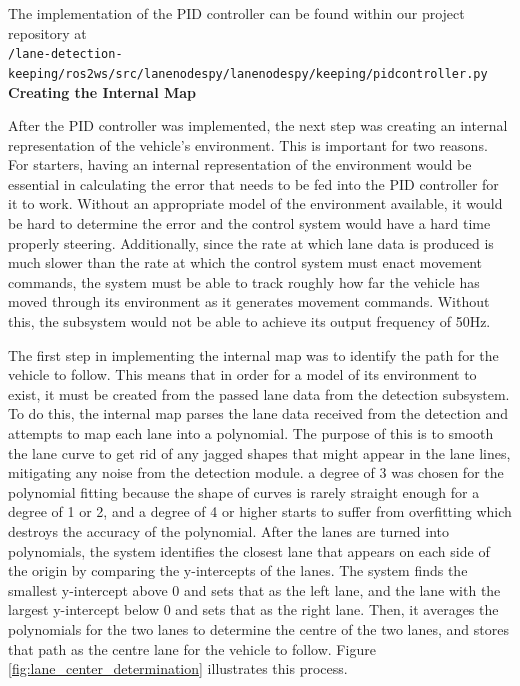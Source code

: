 \documentclass[titlepage, draft]{article}
\begin{document}
{The implementation of the PID controller can be found within our project
repository at \\\texttt{/lane-detection-keeping/ros2\textunderscore ws/src/lane\textunderscore nodes\textunderscore py/lane\textunderscore nodes\textunderscore py/keeping/pid\textunderscore controller.py}
\\

\textbf{Creating the Internal Map}

After the PID controller was implemented, the next step was creating an internal representation of the vehicle's environment. This is important for two reasons. For starters, having an internal representation of the environment would be essential in calculating the error that needs to be fed into the PID controller for it to work. Without an appropriate model of the environment available, it would be hard to determine the error and the control system would have a hard time properly steering. Additionally, since the rate at which lane data is produced is much slower than the rate at which the control system must enact movement commands, the system must be able to track roughly how far the vehicle has moved through its environment as it generates movement commands. Without this, the subsystem would not be able to achieve its output frequency of 50Hz.

The first step in implementing the internal map was to identify the path for the vehicle to follow. This means that in order for a model of its environment to exist, it must be created from the passed lane data from the detection subsystem. To do this, the internal map parses the lane data received from the detection and attempts to map each lane into a polynomial. The purpose of this is to smooth the lane curve to get rid of any jagged shapes that might appear in the lane lines, mitigating any noise from the detection module. a degree of 3 was chosen for the polynomial fitting because the shape of curves is rarely straight enough for a degree of 1 or 2, and a degree of 4 or higher starts to suffer from overfitting which destroys the accuracy of the polynomial. After the lanes are turned into polynomials, the system identifies the closest lane that appears on each side of the origin by comparing the y-intercepts of the lanes. The system finds the smallest y-intercept above 0 and sets that as the left lane, and the lane with the largest y-intercept below 0 and sets that as the right lane. Then, it averages the polynomials for the two lanes to determine the centre of the two lanes, and stores that path as the centre lane for the vehicle to follow. Figure \ref{fig:lane_center_determination} illustrates this process.

}
\end{document}
